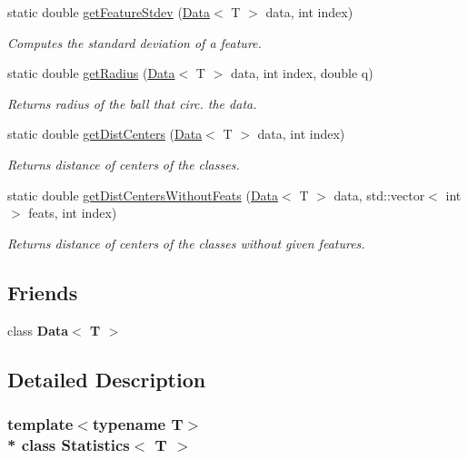 \begin{DoxyCompactItemize}
static double \hyperlink{class_statistics_abc9b84947508360382100784f43d2b25}{get\+Feature\+Stdev} (\hyperlink{class_data}{Data}$<$ T $>$ data, int index)
\begin{DoxyCompactList}\small\item\em Computes the standard deviation of a feature. \end{DoxyCompactList}\item 
static double \hyperlink{class_statistics_a157fcc6f57bed7b0b353bff8145c5964}{get\+Radius} (\hyperlink{class_data}{Data}$<$ T $>$ data, int index, double q)
\begin{DoxyCompactList}\small\item\em Returns radius of the ball that circ. the data. \end{DoxyCompactList}\item 
static double \hyperlink{class_statistics_ac7673aaf51acf57cfc240cb213f4b30f}{get\+Dist\+Centers} (\hyperlink{class_data}{Data}$<$ T $>$ data, int index)
\begin{DoxyCompactList}\small\item\em Returns distance of centers of the classes. \end{DoxyCompactList}\item 
static double \hyperlink{class_statistics_a781ebfca723e5c57db495635225363e6}{get\+Dist\+Centers\+Without\+Feats} (\hyperlink{class_data}{Data}$<$ T $>$ data, std\+::vector$<$ int $>$ feats, int index)
\begin{DoxyCompactList}\small\item\em Returns distance of centers of the classes without given features. \end{DoxyCompactList}\end{DoxyCompactItemize}
\subsection*{Friends}
\begin{DoxyCompactItemize}
\item 
class {\bfseries Data$<$ T $>$}\hypertarget{class_statistics_a51b30b6248fac4c53524437ace868c08}{}\label{class_statistics_a51b30b6248fac4c53524437ace868c08}

\end{DoxyCompactItemize}


\subsection{Detailed Description}
\subsubsection*{template$<$typename T$>$\\*
class Statistics$<$ T $>$}

